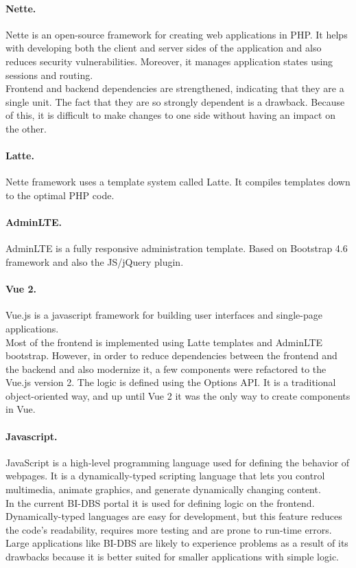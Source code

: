\paragraph*{Nette.} Nette is an open-source framework for creating web applications in PHP. It helps with developing both the client and server sides of the application and also reduces security vulnerabilities. Moreover, it manages application states using sessions and routing. \cite{nette-doc}\\ 
Frontend and backend dependencies are strengthened, indicating that they are a single unit. The fact that they are so strongly dependent is a drawback. Because of this, it is difficult to make changes to one side without having an impact on the other. 

\paragraph*{Latte.} Nette framework uses a template system called Latte. It compiles templates down to the optimal PHP code. \cite{latte-doc}

\paragraph*{AdminLTE.} AdminLTE is a fully responsive administration template. Based on Bootstrap 4.6 framework and also the JS/jQuery plugin. \cite{adminlte-doc} 

\paragraph*{Vue 2.} Vue.js is a javascript framework for building user interfaces and single-page applications.\\
Most of the frontend is implemented using Latte templates and AdminLTE bootstrap. However, in order to reduce dependencies between the frontend and the backend and also modernize it, a few components were refactored to the Vue.js version 2. The logic is defined using the Options API. It is a traditional object-oriented way, and up until Vue 2 it was the only way to create components in Vue. \cite{vue2-doc, apivue-dzakelsek}

\paragraph*{Javascript.} JavaScript is a high-level programming language used for defining the behavior of webpages. It is a dynamically-typed scripting language that lets you control multimedia, animate graphics, and generate dynamically changing content. \cite{js-doc}\\ 
In the current BI-DBS portal it is used for defining logic on the frontend. Dynamically-typed languages are easy for development, but this feature reduces the code's readability, requires more testing and are prone to run-time errors. Large applications like BI-DBS are likely to experience problems as a result of its drawbacks because it is better suited for smaller applications with simple logic.


